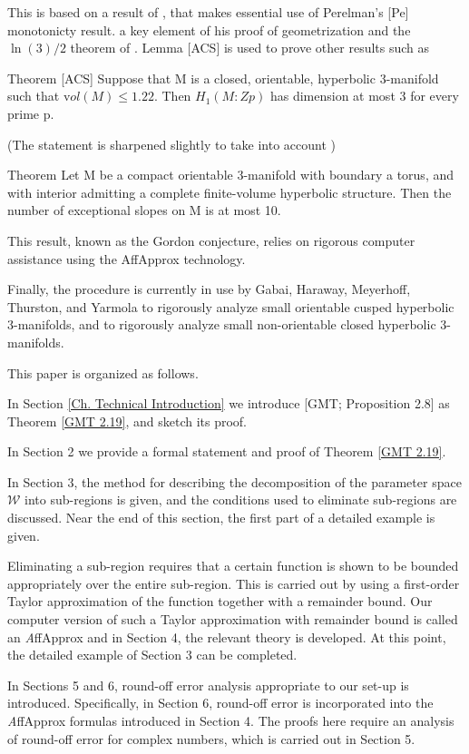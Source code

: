 This is based on a result of \cite{ADST},
that makes essential use of Perelman's [Pe] monotonicty result.
a key element of his proof of geometrization and the $\ln(3)/2$
theorem of \cite{GMT}.
Lemma [ACS] is used to prove other results such as 

Theorem [ACS] Suppose that M is a closed, orientable, hyperbolic
3-manifold such that ${\mathrm vol}(M) \le 1.22$.
Then $H_1(M:Zp)$ has dimension at most 3 for every prime p.

(The statement is sharpened slightly to take into account \cite{GT})

Theorem \cite{LM} Let M be a compact orientable 3-manifold with boundary a torus,
and with interior admitting a complete finite-volume hyperbolic structure.
Then the number of exceptional slopes on M is at most 10.

This result, known as the Gordon conjecture,
relies on rigorous computer assistance using the AffApprox technology.

Finally, the procedure is currently in use
by Gabai, Haraway, Meyerhoff, Thurston, and Yarmola
to rigorously analyze small orientable cusped hyperbolic $3$-manifolds,
and to rigorously analyze small non-orientable closed hyperbolic $3$-manifolds.


This paper is organized as follows.

In Section \ref{Ch. Technical Introduction} we introduce
[GMT; Proposition 2.8] as Theorem \ref{GMT 2.19}, %
and sketch its proof.

In Section 2 we provide a formal statement and proof of Theorem \ref{GMT 2.19}.

In Section 3,
the method for describing the decomposition
of the parameter space ${\mathcal W}$ into sub-regions is given,
and the conditions used to eliminate sub-regions are discussed.
Near the end of this section, the first part of a detailed example is given.

Eliminating 
a sub-region requires that a certain function is shown to be bounded 
appropriately over the entire sub-region.  This is carried out by using a 
first-order Taylor approximation of the function together with a 
remainder 
bound.
Our computer version of such a Taylor approximation with remainder bound 
is called an {\textit AffApprox} and in Section 4,
the relevant theory is developed.
At this point, the detailed example of Section 3 can be completed.

In Sections 5 and 6, round-off error analysis appropriate to our 
set-up is introduced.  Specifically, in Section 6, round-off error is 
incorporated 
into the {\textit AffApprox} formulas introduced in Section 4.  The proofs here 
require an analysis of round-off error for complex numbers, which is carried 
out in Section 5.

